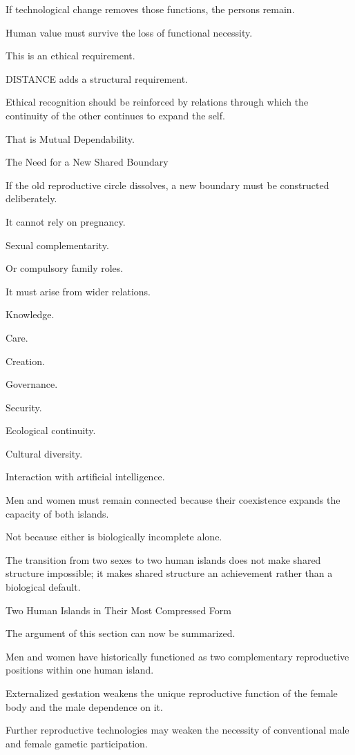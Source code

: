 If technological change removes those functions, the persons remain.

Human value must survive the loss of functional necessity.

This is an ethical requirement.

DISTANCE adds a structural requirement.

Ethical recognition should be reinforced by relations through which the continuity of the other continues to expand the self.

That is Mutual Dependability.

The Need for a New Shared Boundary

If the old reproductive circle dissolves, a new boundary must be constructed deliberately.

It cannot rely on pregnancy.

Sexual complementarity.

Or compulsory family roles.

It must arise from wider relations.

Knowledge.

Care.

Creation.

Governance.

Security.

Ecological continuity.

Cultural diversity.

Interaction with artificial intelligence.

Men and women must remain connected because their coexistence expands the capacity of both islands.

Not because either is biologically incomplete alone.

The transition from two sexes to two human islands does not make shared structure impossible; it makes shared structure an achievement rather than a biological default.

Two Human Islands in Their Most Compressed Form

The argument of this section can now be summarized.

Men and women have historically functioned as two complementary reproductive positions within one human island.

Externalized gestation weakens the unique reproductive function of the female body and the male dependence on it.

Further reproductive technologies may weaken the necessity of conventional male and female gametic participation.

